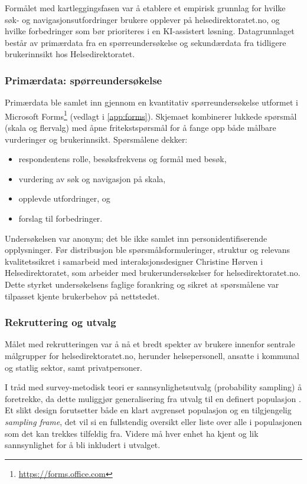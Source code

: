 Formålet med kartleggingsfasen var å etablere et empirisk grunnlag for hvilke søk- og navigasjonsutfordringer brukere opplever på helsedirektoratet.no, og hvilke forbedringer som bør prioriteres i en KI-assistert løsning. Datagrunnlaget består av primærdata fra en spørreundersøkelse og sekundærdata fra tidligere brukerinnsikt hos Helsedirektoratet.

\subsubsection{Primærdata: spørreundersøkelse}
\label{sec:survey}

Primærdata ble samlet inn gjennom en kvantitativ spørreundersøkelse utformet i Microsoft Forms\footnote{\url{https://forms.office.com}} (vedlagt i \autoref{app:forms}). Skjemaet kombinerer lukkede spørsmål (skala og flervalg) med åpne fritekstspørsmål for å fange opp både målbare vurderinger og brukerinnsikt. Spørsmålene dekker:

\begin{itemize}
    \item respondentens rolle, besøksfrekvens og formål med besøk,
    \item vurdering av søk og navigasjon på skala,
    \item opplevde utfordringer, og
    \item forslag til forbedringer.
\end{itemize}

Undersøkelsen var anonym; det ble ikke samlet inn personidentifiserende opplysninger. Før distribusjon ble spørsmålsformuleringer, struktur og relevans kvalitetssikret i samarbeid med interaksjonsdesigner Christine Hørven i Helsedirektoratet, som arbeider med brukerundersøkelser for helsedirektoratet.no. Dette styrket undersøkelsens faglige forankring og sikret at spørsmålene var tilpasset kjente brukerbehov på nettstedet.

\subsubsection{Rekruttering og utvalg}
\label{sec:utvalg}

Målet med rekrutteringen var å nå et bredt spekter av brukere innenfor sentrale målgrupper for helsedirektoratet.no, herunder helsepersonell, ansatte i kommunal og statlig sektor, samt privatpersoner.

I tråd med survey-metodisk teori er sannsynlighetsutvalg (probability sampling) å foretrekke, da dette muliggjør generalisering fra utvalg til en definert populasjon \parencite[139-140]{creswell2014}. Et slikt design forutsetter både en klart avgrenset populasjon og en tilgjengelig \textit{sampling frame}, det vil si en fullstendig oversikt eller liste over alle i populasjonen som det kan trekkes tilfeldig fra. Videre må hver enhet ha kjent og lik sannsynlighet for å bli inkludert i utvalget.

